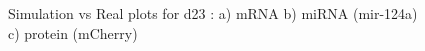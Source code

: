 \documentclass{article}
\begin{document}
\begin{figure}[h!]
\caption{Simulation vs Real plots for d23 : a) mRNA b) miRNA (mir-124a) c) protein (mCherry)}
\label{resultsd23}
\end{figure}

\begin{figure}[h!]
\centering
{}

\end{figure}
\end{document}

